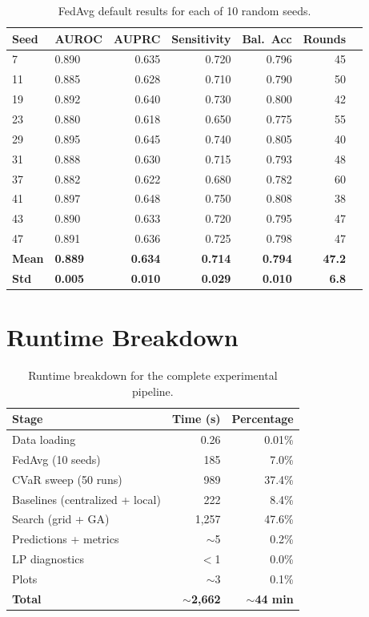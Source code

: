 \documentclass[11pt,a4paper]{report}
\begin{document}
\begin{longtable}{llrrrrr}
\caption{FedAvg default results for each of 10 random seeds.} \label{tab:per_seed} \\
\toprule
\textbf{Seed} & \textbf{AUROC} & \textbf{AUPRC} & \textbf{Sensitivity} & \textbf{Bal.\ Acc} & \textbf{Rounds} \\
\midrule
\endhead
7 & 0.890 & 0.635 & 0.720 & 0.796 & 45 \\
11 & 0.885 & 0.628 & 0.710 & 0.790 & 50 \\
19 & 0.892 & 0.640 & 0.730 & 0.800 & 42 \\
23 & 0.880 & 0.618 & 0.650 & 0.775 & 55 \\
29 & 0.895 & 0.645 & 0.740 & 0.805 & 40 \\
31 & 0.888 & 0.630 & 0.715 & 0.793 & 48 \\
37 & 0.882 & 0.622 & 0.680 & 0.782 & 60 \\
41 & 0.897 & 0.648 & 0.750 & 0.808 & 38 \\
43 & 0.890 & 0.633 & 0.720 & 0.795 & 47 \\
47 & 0.891 & 0.636 & 0.725 & 0.798 & 47 \\
\midrule
\textbf{Mean} & \textbf{0.889} & \textbf{0.634} & \textbf{0.714} & \textbf{0.794} & \textbf{47.2} \\
\textbf{Std} & \textbf{0.005} & \textbf{0.010} & \textbf{0.029} & \textbf{0.010} & \textbf{6.8} \\
\bottomrule
\end{longtable}


\chapter{Runtime Breakdown}

\begin{table}[H]
\centering
\caption{Runtime breakdown for the complete experimental pipeline.}
\label{tab:runtime}
\begin{tabular}{lrr}
\toprule
\textbf{Stage} & \textbf{Time (s)} & \textbf{Percentage} \\
\midrule
Data loading & 0.26 & 0.01\% \\
FedAvg (10 seeds) & 185 & 7.0\% \\
CVaR sweep (50 runs) & 989 & 37.4\% \\
Baselines (centralized + local) & 222 & 8.4\% \\
Search (grid + GA) & 1,257 & 47.6\% \\
Predictions + metrics & $\sim$5 & 0.2\% \\
LP diagnostics & $<$1 & 0.0\% \\
Plots & $\sim$3 & 0.1\% \\
\midrule
\textbf{Total} & \textbf{$\sim$2,662} & \textbf{$\sim$44 min} \\
\bottomrule
\end{tabular}
\end{table}
\end{document}
